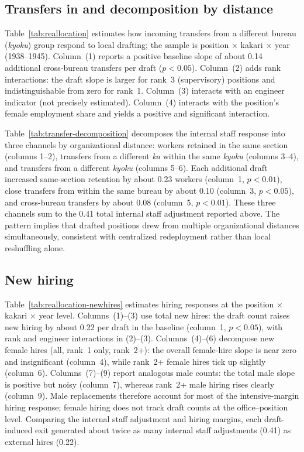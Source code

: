 \subsection{Transfers in and decomposition by distance}

Table~\ref{tab:reallocation} estimates how incoming transfers from a different bureau (\emph{kyoku}) group respond to local drafting; the sample is position $\times$ kakari $\times$ year (1938--1945). Column~(1) reports a positive baseline slope of about 0.14 additional cross-bureau transfers per draft ($p<0.05$). Column~(2) adds rank interactions: the draft slope is larger for rank~3 (supervisory) positions and indistinguishable from zero for rank~1. Column~(3) interacts with an engineer indicator (not precisely estimated). Column~(4) interacts with the position's female employment share and yields a positive and significant interaction.

Table~\ref{tab:transfer-decomposition} decomposes the internal staff response into three channels by organizational distance: workers retained in the same section (columns 1--2), transfers from a different \emph{ka} within the same \emph{kyoku} (columns 3--4), and transfers from a different \emph{kyoku} (columns 5--6). Each additional draft increased same-section retention by about 0.23 workers (column~1, $p<0.01$), close transfers from within the same bureau by about 0.10 (column~3, $p<0.05$), and cross-bureau transfers by about 0.08 (column~5, $p<0.01$). These three channels sum to the 0.41 total internal staff adjustment reported above. The pattern implies that drafted positions drew from multiple organizational distances simultaneously, consistent with centralized redeployment rather than local reshuffling alone.

\subsection{New hiring}

Table~\ref{tab:reallocation-newhires} estimates hiring responses at the position $\times$ kakari $\times$ year level. Columns~(1)--(3) use total new hires: the draft count raises new hiring by about 0.22 per draft in the baseline (column~1, $p<0.05$), with rank and engineer interactions in (2)--(3). Columns~(4)--(6) decompose new female hires (all, rank~1 only, rank~2+): the overall female-hire slope is near zero and insignificant (column~4), while rank~2+ female hires tick up slightly (column~6). Columns~(7)--(9) report analogous male counts: the total male slope is positive but noisy (column~7), whereas rank~2+ male hiring rises clearly (column~9). Male replacements therefore account for most of the intensive-margin hiring response; female hiring does not track draft counts at the office--position level. Comparing the internal staff adjustment and hiring margins, each draft-induced exit generated about twice as many internal staff adjustments (0.41) as external hires (0.22).


